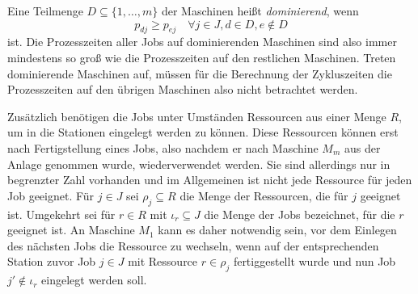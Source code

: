 \documentclass{scrreprt}
\begin{document}
Eine Teilmenge $D \subseteq \{1,\ldots,m\}$ der Maschinen heißt \textit{dominierend}, wenn 
\[ p_{dj} \geq p_{ej} \quad \forall j\in J, d\in D, e\not\in D \] 
ist. Die Prozesszeiten aller Jobs auf dominierenden Maschinen sind also immer mindestens so groß wie die Prozesszeiten auf den restlichen Maschinen.
Treten dominierende Maschinen auf, müssen für die Berechnung der Zykluszeiten die Prozesszeiten auf den übrigen Maschinen also nicht betrachtet werden.

Zusätzlich benötigen die Jobs unter Umständen Ressourcen aus einer Menge $R$, um in die Stationen eingelegt werden zu können. Diese Ressourcen können erst nach
Fertigstellung eines Jobs, also nachdem er nach Maschine $M_m$ aus der Anlage genommen wurde, wiederverwendet werden.
Sie sind allerdings nur in begrenzter Zahl vorhanden und im Allgemeinen ist nicht jede Ressource für jeden Job geeignet.
Für $j\in J$ sei $\rho_j\subseteq R$ die Menge der Ressourcen, die für $j$ geeignet ist.
Umgekehrt sei für $r\in R$ mit $\iota_r\subseteq J$ die Menge der Jobs bezeichnet, für die $r$ geeignet ist.
An Maschine $M_1$ kann es daher notwendig sein, vor dem Einlegen des nächsten Jobs die Ressource zu wechseln, 
wenn auf der entsprechenden Station zuvor Job $j\in J$ mit Ressource $r\in\rho_j$ fertiggestellt wurde 
und nun Job $j'\not\in\iota_r$ eingelegt werden soll.
\end{document}
